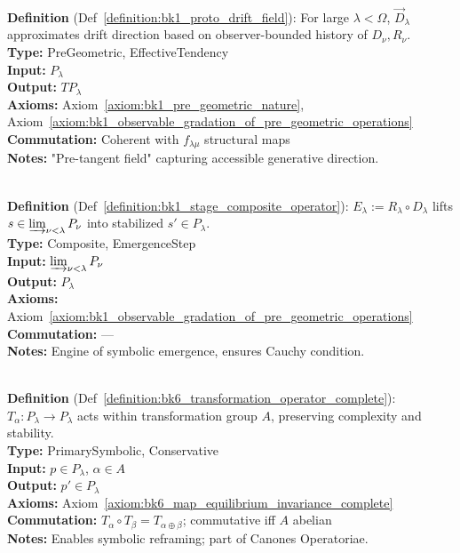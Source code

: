 \begin{description}[leftmargin=2.5cm, style=nextline]
\item[\textbf{Proto--Drift Field} \hfill \( \vec{D}_{\lambda} \)] \leavevmode\\
\textbf{Definition} (Def~\ref{definition:bk1_proto_drift_field}): For large \( \lambda < \Omega \), \( \vec{D}_{\lambda} \) approximates drift direction based on observer-bounded history of \( D_\nu, R_\nu \).\\
\textbf{Type:} PreGeometric, EffectiveTendency\\
\textbf{Input:} \( P_\lambda \)\\
\textbf{Output:} \( T P_\lambda \)\\
\textbf{Axioms:} Axiom~\ref{axiom:bk1_pre_geometric_nature}, Axiom~\ref{axiom:bk1_observable_gradation_of_pre_geometric_operations}\\
\textbf{Commutation:} Coherent with \( f_{\lambda\mu} \) structural maps\\
\textbf{Notes:} "Pre-tangent field" capturing accessible generative direction.

\item[\textbf{Stage--Composite Operator} \hfill \( E_{\lambda} \)] \leavevmode\\
\textbf{Definition} (Def~\ref{definition:bk1_stage_composite_operator}): \( E_{\lambda} := R_{\lambda} \circ D_{\lambda} \) lifts \( s \in \varinjlim_{\nu<\lambda} P_\nu \) into stabilized \( s' \in P_\lambda \).\\
\textbf{Type:} Composite, EmergenceStep\\
\textbf{Input:} \( \varinjlim_{\nu<\lambda} P_\nu \)\\
\textbf{Output:} \( P_\lambda \)\\
\textbf{Axioms:} Axiom~\ref{axiom:bk1_observable_gradation_of_pre_geometric_operations}\\
\textbf{Commutation:} ---\\
\textbf{Notes:} Engine of symbolic emergence, ensures Cauchy condition.

\item[\textbf{Transformation Operator} \hfill \( T_{\alpha} \)] \leavevmode\\
\textbf{Definition} (Def~\ref{definition:bk6_transformation_operator_complete}): \( T_\alpha : P_\lambda \rightarrow P_\lambda \) acts within transformation group \( A \), preserving complexity and stability.\\
\textbf{Type:} PrimarySymbolic, Conservative\\
\textbf{Input:} \( p \in P_\lambda \), \( \alpha \in A \)\\
\textbf{Output:} \( p' \in P_\lambda \)\\
\textbf{Axioms:} Axiom~\ref{axiom:bk6_map_equilibrium_invariance_complete}\\
\textbf{Commutation:} \( T_\alpha \circ T_\beta = T_{\alpha \oplus \beta} \); commutative iff \( A \) abelian\\
\textbf{Notes:} Enables symbolic reframing; part of Canones Operatoriae.


\end{description}
